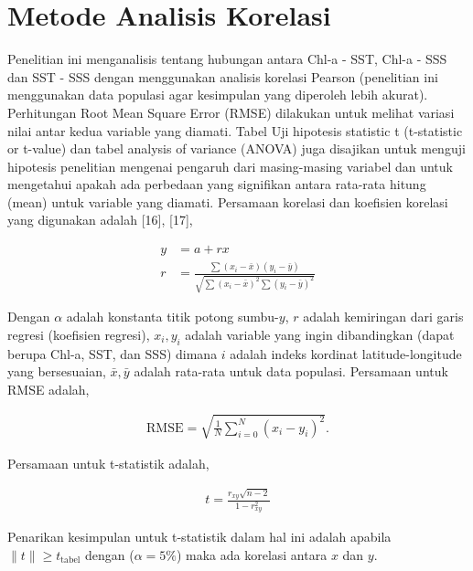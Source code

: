 \vspace{-0.5pc}

\section[Metode Analisis Korelasi]{Metode Analisis Korelasi}
\begin{spacing}{1.5}
	Penelitian ini menganalisis tentang hubungan antara Chl-a - SST, Chl-a - SSS dan SST - SSS dengan menggunakan analisis korelasi Pearson (penelitian ini menggunakan data populasi agar kesimpulan yang diperoleh lebih akurat). Perhitungan Root Mean Square Error (RMSE) dilakukan untuk melihat variasi nilai antar kedua variable yang diamati. Tabel Uji hipotesis statistic t (t-statistic or t-value) dan tabel analysis of variance (ANOVA) juga disajikan untuk menguji hipotesis penelitian mengenai pengaruh dari masing-masing variabel dan untuk mengetahui apakah ada perbedaan yang signifikan antara rata-rata hitung (mean) untuk variable yang diamati. Persamaan korelasi dan koefisien korelasi yang digunakan adalah [16], [17],
	
	\begin{equation}
		\begin{aligned}
			y &= a+rx\\
			r &= \frac{\sum (x_i - \bar{x})(y_i - \bar{y})}{\sqrt{\sum (x_i-\bar{x})^2\sum (y_i-\bar{y})^2}}
		\end{aligned}
	\end{equation}

	Dengan $\alpha$ adalah konstanta titik potong sumbu-$y$, $r$ adalah kemiringan dari garis regresi (koefisien regresi), $x_i, y_i$ adalah variable yang ingin dibandingkan (dapat berupa Chl-a, SST, dan SSS) dimana $i$ adalah indeks kordinat latitude-longitude yang bersesuaian, $\bar{x},\bar{y}$ adalah rata-rata untuk data populasi. Persamaan untuk RMSE adalah,
	
	\begin{equation}
		\begin{aligned}
			\text{RMSE}=\sqrt{\frac{1}{N}\sum_{i=0}^{N}(x_i-y_i)^2}.
		\end{aligned}
	\end{equation}
	
	Persamaan untuk t-statistik adalah,
	
	\begin{equation}
		\begin{aligned}
			t=\frac{r_{xy}\sqrt{n-2}}{1-r^2_{xy}}
		\end{aligned}
	\end{equation}
	
	Penarikan kesimpulan untuk t-statistik dalam hal ini adalah apabila $\|t\|\geq t_{\text{tabel}}$ dengan ($\alpha=5\%$) maka ada korelasi antara $x$ dan $y$.
\end{spacing}
\vspace{-0.5pc}


